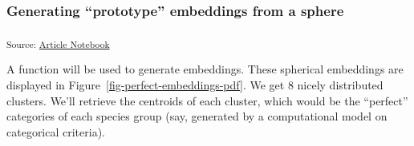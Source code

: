 \documentclass[
  authoryear]{elsarticle}
\begin{document}
\subsubsection{Generating ``prototype'' embeddings from a
sphere}\label{generating-prototype-embeddings-from-a-sphere}

\textsubscript{Source:
\href{https://m-delem.github.io/2499-similarity-manuscript/index.qmd.html}{Article
Notebook}}

A function will be used to generate embeddings. These spherical
embeddings are displayed in {Figure~\ref{fig-perfect-embeddings-pdf}}.
We get 8 nicely distributed clusters. We'll retrieve the centroids of
each cluster, which would be the ``perfect'' categories of each species
group (say, generated by a computational model on categorical criteria).
\end{document}
